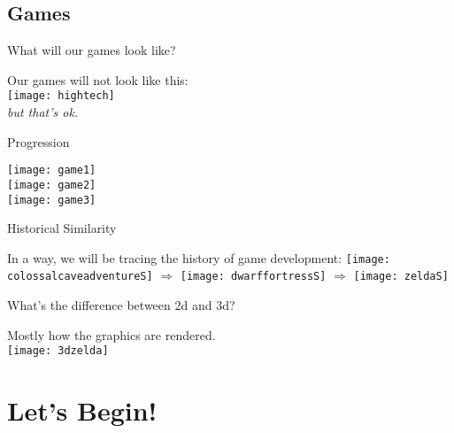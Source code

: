 \subsection{Games}

\begin{frame}{What will our games look like?}
\begin{center}
Our games will not look like this:\\
\texttt{[image: hightech]}\\ \pause
\emph{but that's ok.}
\end{center}

\end{frame}

\begin{frame}{Progression}
\begin{center}
\texttt{[image: game1]} \\ \pause
\texttt{[image: game2]} \\ \pause
\texttt{[image: game3]} \\ \pause


\end{center}
\end{frame}

\begin{frame}{Historical Similarity}
\begin{center}
In a way, we will be tracing the history of game development:
\texttt{[image: colossalcaveadventureS]} $\Rightarrow$
\texttt{[image: dwarffortressS]} $\Rightarrow$
\texttt{[image: zeldaS]} \\
\end{center}
\end{frame}

\begin{frame}{What's the difference between 2d and 3d?}
\begin{center}
Mostly how the graphics are rendered.\\
\texttt{[image: 3dzelda]}
\end{center}
\end{frame}

\section{Let's Begin!}
